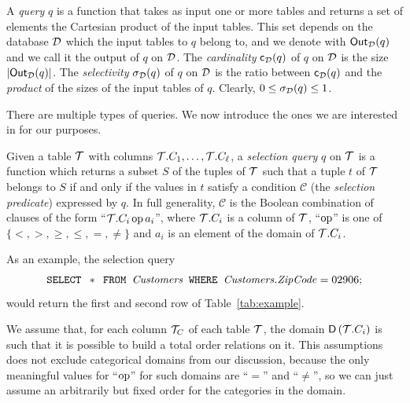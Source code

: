A \emph{query} $q$ is a function that takes as input one or more tables and
returns a set of elements the Cartesian product of the input tables. This set
depends on the database ${\cal D}$ which the input tables to $q$ belong to, and we
denote with $\mathsf{Out}_{\cal D}(q)$ and we call it the output of $q$ on ${\cal D}$. The
\emph{cardinality} $\mathsf{c}_{\cal D}(q)$ of $q$ on ${\cal D}$ is the size
$|\mathsf{Out}_{\cal D}(q)|$. The \emph{selectivity} $\sigma_{\cal D}(q)$ of $q$ on ${\cal D}$ is
the ratio between $\mathsf{c}_{\cal D}(q)$ and the \emph{product} of the sizes of the
input tables of $q$.  Clearly, $0\le\sigma_{\cal D}(q)\le 1$.

There are multiple types of queries. We now introduce the ones we are interested
in for our purposes.
\begin{definition}\label{def:selectquery}
  Given a table ${\cal T}$ with columns ${\cal T}.C_1,\dotsc,{\cal T}.C_\ell$, a
  \emph{selection query} $q$ on ${\cal T}$ is a function which returns a subset
  $S$ of the tuples of ${\cal T}$ such that a tuple $t$ of ${\cal T}$ belongs to $S$ if
  and only if the values in $t$ satisfy a condition $\mathcal{C}$
  (the \emph{selection predicate}) expressed by $q$. In full
  generality, $\mathcal{C}$ is the Boolean combination of clauses of the form
  ``${\cal T}.C_i \operatorname{op} a_i$'', where ${\cal T}.C_i$ is a column of ${\cal T}$, ``$\operatorname{op}$'' is one
  of $\{<,>,\ge,\le,=,\neq\}$ and $a_i$ is an element of the domain of
  ${\cal T}.C_i$.
\end{definition}

As an example, the selection query 
\[
\mbox{\texttt{SELECT }} * \mbox{\texttt{ FROM }} \mbox{\emph{Customers}} \mbox{\texttt{ WHERE }} \mbox{\emph{Customers.ZipCode}} = 02906;
\]
would return the first and second row of Table~\ref{tab:example}.

We assume that, for each column ${\cal T}_C$ of each table ${\cal T}$, the domain
$\mathsf{D}\left({\cal T}.C_i\right)$ is such that it is possible to build a total order relations
on it. This assumptions does not exclude categorical domains from our
discussion, because the only meaningful values for ``$\operatorname{op}$'' for such domains
are ``$=$'' and ``$\neq$'', so we can just assume an arbitrarily but fixed order
for the categories in the domain.

